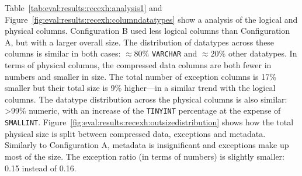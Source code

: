 Table~\ref{tab:eval:results:recexh:analysis1} and Figure~\ref{fig:eval:results:recexh:columndatatypes} show a analysis of the logical and physical columns. Configuration B used less logical columns than Configuration A, but with a larger overall size. The distribution of datatypes across these columns is similar in both cases: \(\approx80\%\) \verb|VARCHAR| and \(\approx20\%\) other datatypes. In terms of physical columns, the compressed data columns are both fewer in numbers and smaller in size. The total number of exception columns is 17\% smaller but their total size is 9\% higher---in a similar trend with the logical columns. The datatype distribution across the physical columns is also similar: >99\% numeric, with an increase of the \verb|TINYINT| percentage at the expense of \verb|SMALLINT|. Figure~\ref{fig:eval:results:recexh:outsizedistribution} shows how the total physical size is split between compressed data, exceptions and metadata. Similarly to Configuration A, metadata is insignificant and exceptions make up most of the size. The exception ratio (in terms of numbers) is slightly smaller: 0.15 instead of 0.16.


